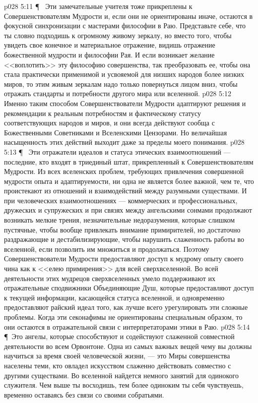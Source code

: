 \vs p028 5:11 \P\ \bibnobreakspace {} Эти замечательные учителя тоже прикреплены к Совершенствователям Мудрости и, если они не ориентированы иначе, остаются в фокусной синхронизации с мастерами философии в Раю. Представьте себе, что ты словно подходишь к огромному живому зеркалу, но вместо того, чтобы увидеть свое конечное и материальное отражение, видишь отражение божественной мудрости и философии Рая. И если возникает желание <<воплотить>> эту философию совершенства, так преобразовать ее, чтобы она стала практически применимой и усвояемой для низших народов более низких миров, то этим живым зеркалам надо только повернуться лицом вниз, чтобы отражать стандарты и потребности другого мира или вселенной.
\vs p028 5:12 Именно таким способом Совершенствователи Мудрости адаптируют решения и рекомендации к реальным потребностям и фактическому статусу соответствующих народов и миров, и они всегда действуют сообща с Божественными Советниками и Вселенскими Цензорами. Но величайшая насыщенность этих действий выходит даже за пределы моего понимания.
\vs p028 5:13 \P\ \bibnobreakspace {} Эти отражатели идеалов и статуса этических взаимоотношений --- последние, кто входят в триединый штат, прикрепленный к Совершенствователям Мудрости. Из всех вселенских проблем, требующих привлечения совершенной мудрости опыта и адаптируемости, ни одна не является более важной, чем те, что проистекают из отношений и взаимодействий между разумными существами. И при человеческих взаимоотношениях --- коммерческих и профессиональных, дружеских и супружеских и при связях между ангельскими сонмами продолжают возникать мелкие трения, незначительные недоразумения, которые слишком пустячные, чтобы вообще привлекать внимание примирителей, но достаточно раздражающие и дестабилизирующие, чтобы нарушить слаженность работы во вселенной, если позволить им множиться и продолжаться. Поэтому Совершенствователи Мудрости предоставляют доступ к мудрому опыту своего чина как к <<елею примирения>> для всей сверхвселенной. Во всей деятельности этих мудрецов сверхвселенных умело поддерживают их отражательные сподвижники Объединяющие Душ, которые предоставляют доступ к текущей информации, касающейся статуса вселенной, и одновременно предоставляют райский идеал того, как лучше всего урегулировать эти сложные проблемы. Когда эти секонафимы не ориентированы специальным образом, то они остаются в отражательной связи с интерпретаторами этики в Раю.
\vs p028 5:14 \P\ Это ангелы, которые способствуют и содействуют слаженной совместной деятельности во всем Орвонтоне. Одна из самых важных вещей чему вы должны научиться за время своей человеческой жизни, --- это  Миры совершенства населены теми, кто овладел искусством слаженно действовать совместно с другими существами. Во вселенной найдется немного занятий для одинокого служителя. Чем выше ты восходишь, тем более одиноким ты себя чувствуешь, временно оставаясь без связи со своими собратьями.
